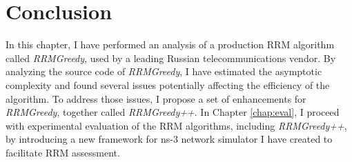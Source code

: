 \section{Conclusion}
\label{chap:research:sec:conclusion}
In this chapter, I have performed an analysis of a production RRM algorithm called \textit{RRMGreedy}, used by a leading Russian telecommunications vendor. By analyzing the source code of \textit{RRMGreedy}, I have estimated the asymptotic complexity and found several issues potentially affecting the efficiency of the algorithm. To address those issues, I propose a set of enhancements for \textit{RRMGreedy}, together called \textit{RRMGreedy++}. In Chapter \ref{chap:eval}, I proceed with experimental evaluation of the RRM algorithms, including \textit{RRMGreedy++}, by introducing a new framework for ns-3 network simulator I have created to facilitate RRM assessment.
